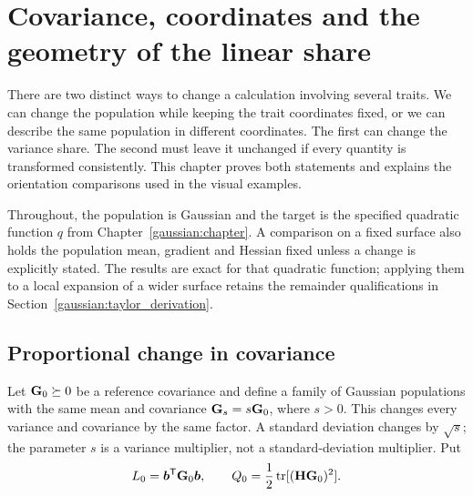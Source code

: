 \chapter{Covariance, coordinates and the geometry of the linear share}
\label{geometry:chapter}

There are two distinct ways to change a calculation involving several
traits. We can change the population while keeping the trait coordinates
fixed, or we can describe the same population in different coordinates.
The first can change the variance share. The second must leave it
unchanged if every quantity is transformed consistently. This chapter
proves both statements and explains the orientation comparisons used in
the visual examples.

Throughout, the population is Gaussian and the target is the specified
quadratic function $q$ from Chapter~\ref{gaussian:chapter}. A comparison
on a fixed surface also holds the population mean, gradient and Hessian
fixed unless a change is explicitly stated. The results are exact for
that quadratic function; applying them to a local expansion of a wider
surface retains the remainder qualifications in
Section~\ref{gaussian:taylor_derivation}.

\section{Proportional change in covariance}
\label{geometry:scaling}

Let $\mathbf{G}_0\succeq0$ be a reference covariance and define a family of
Gaussian populations with the same mean and covariance
$\mathbf{G}_s=s\mathbf{G}_0$, where $s>0$. This changes every variance and
covariance by the same factor. A standard deviation changes by $\sqrt{s}$;
the parameter $s$ is a variance multiplier, not a standard-deviation
multiplier. Put
\[
L_0=\boldsymbol{b}^{\mathsf T}\mathbf{G}_0\boldsymbol{b},
\qquad
Q_0=\frac12\operatorname{tr}[(\mathbf{H}\mathbf{G}_0)^2].
\]

